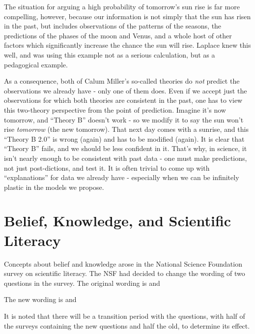 \documentclass{tufte-book}
\begin{document}
The situation for arguing a high probability of tomorrow's sun rise is
far more compelling, however, because our information is not simply that
the sun has risen in the past, but includes observations of the patterns
of the seasons, the predictions of the phases of the moon and Venus, and
a whole host of other factors which significantly increase the chance
the sun will rise. Laplace knew this well, and was using this example
not as a serious calculation, but as a pedagogical example.

As a consequence, both of Calum Miller's so-called theories do
\emph{not} predict the observations we already have - only one of them
does. Even if we accept just the observations for which both theories
are consistent in the past, one has to view this two-theory perspective
from the point of prediction. Imagine it's now tomorrow, and ``Theory
B'' doesn't work - so we modify it to say the sun won't rise
\emph{tomorrow} (the new tomorrow). That next day comes with a sunrise,
and this ``Theory B 2.0'' is wrong (again) and has to be modified
(again). It is clear that ``Theory B'' fails, and we should be less
confident in it. That's why, in science, it isn't nearly enough to be
consistent with past data - one must make predictions, not just
post-dictions, and test it. It is often trivial to come up with
``explanations'' for data we already have - especially when we can be
infinitely plastic in the models we propose.

\section{Belief, Knowledge, and Scientific
Literacy}\label{belief-knowledge-and-scientific-literacy}

Concepts about belief and knowledge arose in the National Science
Foundation survey on scientific literacy. The NSF had decided to change
the wording of two questions in the survey. The original wording is
 and

The new wording is  and

It is noted that there will be a transition period with the questions,
with half of the surveys containing the new questions and half the old,
to determine its effect.
\end{document}
